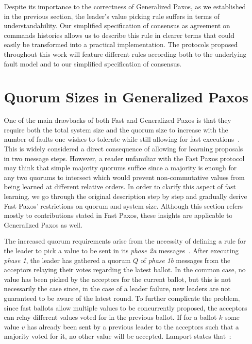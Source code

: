{\color{red}Despite its importance to the correctness of Generalized Paxos, as we established in the previous section, the leader's value picking rule suffers in terms of understandability. Our simplified specification of consensus as agreement on commands histories allows us to describe this rule in clearer terms that could easily be transformed into a practical implementation. The protocols proposed throughout this work will feature different rules according both to the underlying fault model and to our simplified specification of consensus. }

\section{Quorum Sizes in Generalized Paxos} 
One of the main drawbacks of both Fast and Generalized Paxos is that they require both the total system size and the quorum size to increase with the number of faults one wishes to tolerate while still allowing for fast executions~\cite{Lamport2006,Lamport2005}. This is widely considered a direct consequence of allowing for learning proposals in two message steps. However, a reader unfamiliar with the Fast Paxos protocol may think that simple majority quorums suffice since a majority is enough for any two quorums to intersect which would prevent non-commutative values from being learned at different relative orders. In order to clarify this aspect of fast learning, we go through the original description step by step and gradually derive Fast Paxos' restrictions on quorum and system size. Although this section refers mostly to contributions stated in Fast Paxos, these insights are applicable to Generalized Paxos as well.\par
The increased quorum requirements arise from the necessity of defining a rule for the leader to pick a value to be sent in its \textit{phase 2a} messages~\cite{Lamport2006}. After executing \textit{phase 1}, the leader has gathered a quorum $Q$ of \textit{phase 1b} messages from the acceptors relaying their votes regarding the latest ballot. In the common case, no value has been picked by the acceptors for the current ballot, but this is not necessarily the case since, in the case of a leader failure, new leaders are not guaranteed to be aware of the latest round. To further complicate the problem, since fast ballots allow multiple values to be concurrently proposed, the acceptors can relay different values voted for in the previous ballot. If for a ballot $k$ some value $v$ has already been sent by a previous leader to the acceptors such that a majority voted for it, no other value will be accepted. Lamport states that~\cite{Lamport2006}:\par

